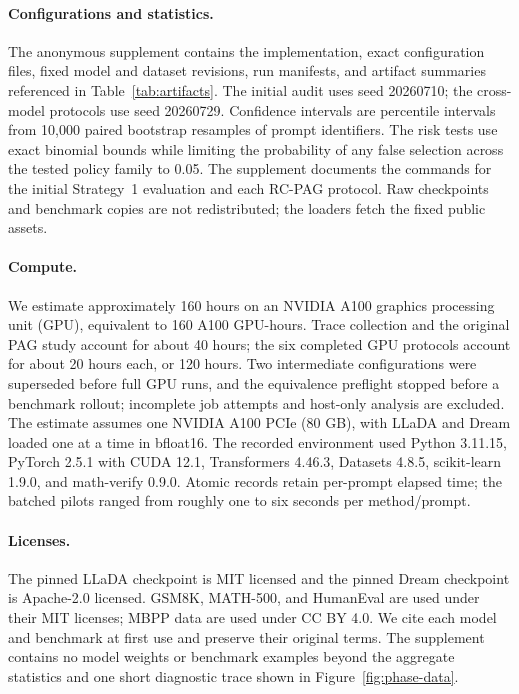 \documentclass{article}
\newcommand{\rcpag}{RC-PAG}
\begin{document}
\paragraph{Configurations and statistics.}
The anonymous supplement contains the implementation, exact configuration files, fixed model and dataset revisions, run manifests, and artifact summaries referenced in Table~\ref{tab:artifacts}. The initial audit uses seed 20260710; the cross-model protocols use seed 20260729. Confidence intervals are percentile intervals from 10{,}000 paired bootstrap resamples of prompt identifiers. The risk tests use exact binomial bounds while limiting the probability of any false selection across the tested policy family to 0.05. The supplement documents the commands for the initial Strategy~1 evaluation and each \rcpag{} protocol. Raw checkpoints and benchmark copies are not redistributed; the loaders fetch the fixed public assets.

\paragraph{Compute.}
We estimate approximately 160 hours on an NVIDIA A100 graphics processing unit (GPU), equivalent to 160 A100 GPU-hours. Trace collection and the original PAG study account for about 40 hours; the six completed GPU protocols account for about 20 hours each, or 120 hours. Two intermediate configurations were superseded before full GPU runs, and the equivalence preflight stopped before a benchmark rollout; incomplete job attempts and host-only analysis are excluded. The estimate assumes one NVIDIA A100 PCIe (80 GB), with LLaDA and Dream loaded one at a time in bfloat16. The recorded environment used Python 3.11.15, PyTorch 2.5.1 with CUDA 12.1, Transformers 4.46.3, Datasets 4.8.5, scikit-learn 1.9.0, and math-verify 0.9.0. Atomic records retain per-prompt elapsed time; the batched pilots ranged from roughly one to six seconds per method/prompt.

\paragraph{Licenses.}
The pinned LLaDA checkpoint is MIT licensed and the pinned Dream checkpoint is Apache-2.0 licensed. GSM8K, MATH-500, and HumanEval are used under their MIT licenses; MBPP data are used under CC BY 4.0. We cite each model and benchmark at first use and preserve their original terms. The supplement contains no model weights or benchmark examples beyond the aggregate statistics and one short diagnostic trace shown in Figure~\ref{fig:phase-data}.
\end{document}
